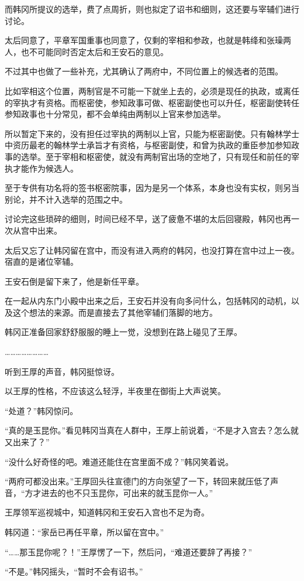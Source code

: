 而韩冈所提议的选举，费了点周折，则也拟定了诏书和细则，这还要与宰辅们进行讨论。

太后同意了，平章军国重事也同意了，仅剩的宰相和参政，也就是韩绛和张璪两人，也不可能同时否定太后和王安石的意见。

不过其中也做了一些补充，尤其确认了两府中，不同位置上的候选者的范围。

比如宰相这个位置，两制官是不可能一下就坐上去的，必须是现任的执政，或离任的宰执才有资格。而枢密使，参知政事可做、枢密副使也可以升任，枢密副使转任参知政事也十分常见，都不会单纯由两制以上官来参加选举。

所以暂定下来的，没有担任过宰执的两制以上官，只能为枢密副使。只有翰林学士中资历最老的翰林学士承旨才有资格，与枢密副使，和曾为执政的重臣参加参知政事的选举。至于宰相和枢密使，就没有两制官出场的空地了，只有现任和前任的宰执才能作为候选人。

至于专供有功名将的签书枢密院事，因为是另一个体系，本身也没有实权，则另当别论，并不计入选举的范围之中。

讨论完这些琐碎的细则，时间已经不早，送了疲惫不堪的太后回寝殿，韩冈也再一次从宫中出来。

太后又忘了让韩冈留在宫中，而没有进入两府的韩冈，也没打算在宫中过上一夜。宿直的是诸位宰辅。

王安石倒是留下来了，他是新任平章。

在一起从内东门小殿中出来之后，王安石并没有向多问什么，包括韩冈的动机，以及这个想法的来源。而是直接去了其他宰辅们落脚的地方。

韩冈正准备回家舒舒服服的睡上一觉，没想到在路上碰见了王厚。

……………………

听到王厚的声音，韩冈挺惊讶。

以王厚的性格，不应该这么轻浮，半夜里在御街上大声说笑。

“处道？”韩冈惊问。

“真的是玉昆你。”看见韩冈当真在人群中，王厚上前说着，“不是才入宫去？怎么就又出来了？”

“没什么好奇怪的吧。难道还能住在宫里面不成？”韩冈笑着说。

“两府可都没出来。”王厚回头往宣德门的方向张望了一下，转回来就压低了声音，“方才进去的也不只玉昆你，可出来的就玉昆你一人。”

王厚领军巡视城中，知道韩冈和王安石入宫也不足为奇。

韩冈道：“家岳已再任平章，所以留在宫中。”

“……那玉昆你呢？！”王厚愣了一下，然后问，“难道还要辞了再接？”

“不是。”韩冈摇头，“暂时不会有诏书。”

